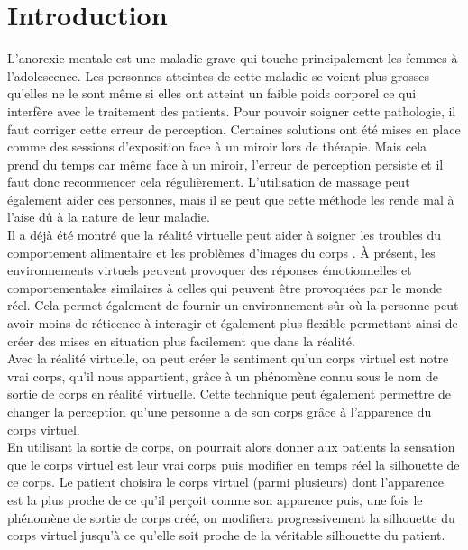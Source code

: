 \documentclass[11pt]{article}
\begin{document}
\section{Introduction}

L'anorexie mentale est une maladie grave qui touche principalement les femmes à l'adolescence. Les personnes atteintes de cette maladie se voient plus grosses qu’elles ne le sont même si elles ont atteint un faible poids corporel ce qui interfère avec le traitement des patients. Pour pouvoir soigner cette pathologie, il faut corriger cette erreur de perception. Certaines solutions ont été mises en place comme des sessions d'exposition face à un miroir lors de thérapie. Mais cela prend du temps car même face à un miroir, l'erreur de perception persiste et il faut donc recommencer cela régulièrement. L'utilisation de massage peut également aider ces personnes, mais il se peut que cette méthode les rende mal à l'aise dû à la nature de leur maladie.\\

Il a déjà été montré que la réalité virtuelle peut aider à soigner les troubles du comportement alimentaire et les problèmes d'images du corps \cite{ri11}\cite{ri13}. \`{A} présent, les environnements virtuels peuvent provoquer des réponses émotionnelles et comportementales similaires à celles qui peuvent être provoquées par le monde réel. Cela permet également de fournir un environnement sûr où la personne peut avoir moins de réticence à interagir et également plus flexible permettant ainsi de créer des mises en situation plus facilement que dans la réalité.\\

Avec la réalité virtuelle, on peut créer le sentiment qu'un corps virtuel est notre vrai corps, qu'il nous appartient, grâce à un phénomène connu sous le nom de sortie de corps en réalité virtuelle. Cette technique peut également permettre de changer la perception qu'une personne a de son corps grâce à l'apparence du corps virtuel.\\

En utilisant la sortie de corps, on pourrait alors donner aux patients la sensation que le corps virtuel est leur vrai corps puis modifier en temps réel la silhouette de ce corps. Le patient choisira le corps virtuel (parmi plusieurs) dont l'apparence est la plus proche de ce qu'il perçoit comme son apparence puis, une fois le phénomène de sortie de corps créé, on modifiera progressivement la silhouette du corps virtuel jusqu'à ce qu'elle soit proche de la véritable silhouette du patient.\\
\end{document}
